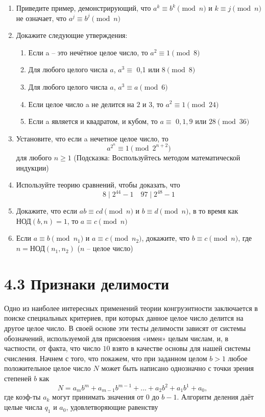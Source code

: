\documentclass[11pt]{article}
\begin{document}
\begin{enumerate}
		\thispagestyle{fancy}
		\rhead{\thepage}
		\item Приведите пример, демонстрирующий, что $a^{k}\equiv b^{k} \pmod {n}$ и $k\equiv j \pmod {n}$ не означает, что $a^{j}\equiv b^{j} \pmod {n}$
		\item Докажите следующие утверждения:
		\begin{enumerate}
			\item Если a -- это нечётное целое число, то $a^{2}\equiv 1\pmod {8} $
			\item Для любого целого числа $a$, $a^{3}\equiv$ 0,1 или 8$\pmod {8}$
			\item Для любого целого числа $a$, $a^{3}\equiv a\pmod {6}$
			\item Если целое число a не делится на $2$ и $3$, то $a^{2} \equiv 1\pmod {24}$
			\item Если a является и квадратом, и кубом, то  $a \equiv$ $0,1,9$ или $28 \pmod {36}$
		\end{enumerate}
		\item Установите, что если a нечетное целое число, то \[a^{2^{n}}\equiv 1\pmod {2^{n+2}}\] для любого $n \geq 1$ (Подсказка: Воспользуйтесь методом математической индукции)
		\item Используйте теорию сравнений, чтобы доказать, что \[8\mid 2^{44}-1 \quad 97\mid2^{48}-1\]
		\item Докажите, что если $ab\equiv cd \pmod {n}$ и $b\equiv d \pmod {n}$, в то время как $\text{НОД} (b,n) = 1$, то $a\equiv c \pmod {n}$
		\item Если $a\equiv b \pmod {n_1}$ и $a\equiv c \pmod {n_2}$, докажите, что $b\equiv c \pmod {n}$, где \\
		$n = \text{НОД} (n_1,n_2)$ ($n$ -- целое число)
	\end{enumerate}
	
	\section* {4.3 Признаки делимости}
	Одно из наиболее интересных применений теории конгруэнтности заключается в поиске специальных критериев, при которых данное целое число делится на другое целое число. В своей основе эти тесты делимости зависят от системы обозначений, используемой для присвоения «имен» целым числам, и, в частности, от факта, что число $10$ взято в качестве основы для нашей системы счисления. Начнем с того, что покажем, что при заданном целом $b>1$ любое положительное целое число $N$ может быть написано однозначно с точки зрения степеней $b$ как
	\[N = a_mb^{m} + a_{m-1}b^{m-1} + ... + a_{2}b^{2} + a_{1}b^{1} + a_{0},\] где коэф-ты $a_{k}$ могут принимать значения от $0$ до $b-1$. Алгоритм деления даёт целые числа $q_{1}$ и $a_{0}$, удовлетворяющие равенству 
	
\end{document}
